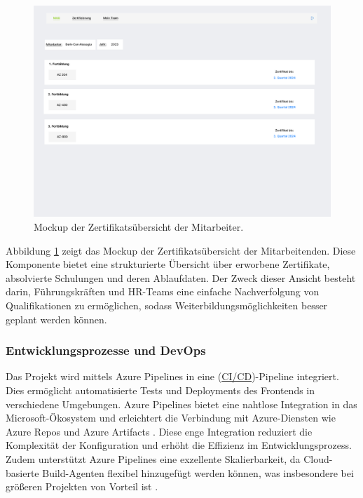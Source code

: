 \begin{figure}[h!]
    \centering
    \includegraphics[width=\textwidth]{images/Zertifikat_mckup.png}
    \caption{Mockup der Zertifikatsübersicht der Mitarbeiter.}
    \label{fig:mockup3}
\end{figure}
\noindent
Abbildung \ref{fig:mockup3} zeigt das Mockup der Zertifikatsübersicht der Mitarbeitenden. Diese Komponente bietet eine strukturierte Übersicht über erworbene Zertifikate, absolvierte Schulungen und deren Ablaufdaten. Der Zweck dieser Ansicht besteht darin, Führungskräften und HR-Teams eine einfache Nachverfolgung von Qualifikationen zu ermöglichen, sodass Weiterbildungsmöglichkeiten besser geplant werden können.


\subsubsection*{Entwicklungsprozesse und DevOps} Das Projekt wird mittels Azure Pipelines in eine (\hyperref[abkuerzungen]{CI/CD})-Pipeline integriert. Dies ermöglicht automatisierte Tests und Deployments des Frontends in verschiedene Umgebungen. Azure Pipelines bietet eine nahtlose Integration in das Microsoft-Ökosystem und erleichtert die Verbindung mit Azure-Diensten wie Azure Repos und Azure Artifacts \cite{microsoftAzurePipelines}. Diese enge Integration reduziert die Komplexität der Konfiguration und erhöht die Effizienz im Entwicklungsprozess. Zudem unterstützt Azure Pipelines eine exzellente Skalierbarkeit, da Cloud-basierte Build-Agenten flexibel hinzugefügt werden können, was insbesondere bei größeren Projekten von Vorteil ist \cite{ciCdScalability}.

